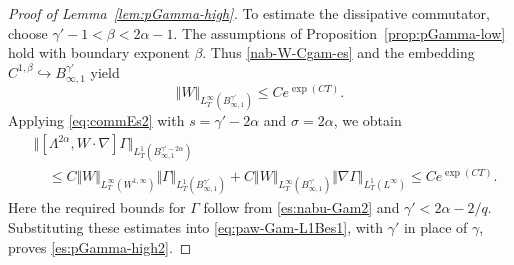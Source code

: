 \documentclass[reqno,11pt,a4paper]{amsart}
\begin{document}
\begin{proof}[Proof of Lemma~\ref{lem:pGamma-high}]
To estimate the dissipative commutator, choose
$\gamma'-1<\beta<2\alpha-1$.
The assumptions of Proposition~\ref{prop:pGamma-low}
hold with boundary exponent $\beta$.
Thus \eqref{nab-W-Cgam-es} and the embedding
$C^{1,\beta}\hookrightarrow B^{\gamma'}_{\infty,1}$
yield
\[
  \Vert W\Vert _{L^\infty_T(B^{\gamma'}_{\infty,1})}
  \leq Ce^{\exp(CT)}.
\]
Applying \eqref{eq:commEs2} with
$s=\gamma'-2\alpha$ and $\sigma=2\alpha$, we obtain
\begin{align*}
  &\Vert [\Lambda^{2\alpha},W\cdot\nabla]\Gamma
    \Vert _{L^1_T(B^{\gamma'-2\alpha}_{\infty,1})}
  \\
  &\quad\leq
  C\Vert W\Vert _{L^\infty_T(W^{1,\infty})}
    \Vert \Gamma\Vert _{L^1_T(B^{\gamma'}_{\infty,1})}
  +C\Vert W\Vert _{L^\infty_T(B^{\gamma'}_{\infty,1})}
    \Vert \nabla\Gamma\Vert _{L^1_T(L^\infty)}
  \leq Ce^{\exp(CT)}.
\end{align*}
Here the required bounds for $\Gamma$ follow from
\eqref{es:nabu-Gam2} and $\gamma'<2\alpha-2/q$.
Substituting these estimates into
\eqref{eq:paw-Gam-L1Bes1}, with $\gamma'$ in place
of $\gamma$, proves \eqref{es:pGamma-high2}.
\end{proof}
\end{document}

